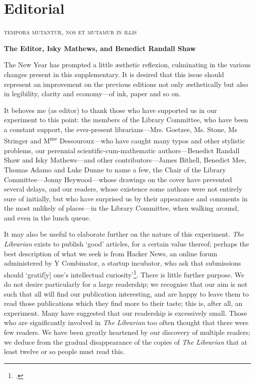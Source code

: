 \chapter{Editorial}

\hspace{\fill}\textsc{tempora mutantur, nos et mutamur in illis}

\hspace{\fill}\textbf{{The Editor, Isky Mathews, and Benedict Randall Shaw}}

\begin{multicols}{2}

The New Year has prompted a little æsthetic reflexion, culminating in the 
various changes present in this supplementary. It is desired that this issue
should represent an improvement on the previous editions not only æsthetically
but also in legibility, clarity and economy---of ink, paper and so on. 

It behoves me (as editor) to thank those who have supported us in our experiment
to this point: the members of the Library Committee, who have been a constant 
support, the ever-present librarians---Mrs. Goetzee, Ms. Stone, Ms Stringer and 
M\textsuperscript{me} Dessouroux---who have caught many typos and other stylistic problems, our 
perennial scientific-cum-mathematic authors---Benedict Randall Shaw and Isky 
Mathews---and other contributors---James Bithell, Benedict Mee, Thomas Adamo 
and Luke Dunne to name a few, the Chair of the Library Committee---Jonny 
Heywood---whose drawings on the cover have prevented several delays, and our 
readers, whose existence some authors were not entirely sure of initially, but 
who have surprised us by their appearance and comments in the most unlikely of 
places---in the Library Committee, when walking around, and even in the lunch 
queue.

It may also be useful to elaborate further on the nature of this experiment. 
\textit{The Librarian} exists to publish `good' articles, for a certain value 
thereof; perhaps the best description of what we seek is from Hacker News, an 
online forum administered by Y Combinator, a startup incubator, who ask that 
submissions should `gratif[y] one's intellectual curiosity'\footcite{hn}. 
There is little further purpose. We do not desire particularly for a large 
readership; we recognise that our aim is not such that all will find our 
publication interesting, and are happy to leave them to read those publications which they find more to their taste; this is, after all, an experiment. Many have suggested that our readership is excessively small. Those who
are significantly involved in \textit{The Librarian} too often thought that
there were few readers. We have been greatly heartened by our discovery of 
multiple readers; we deduce from the gradual disappearance of the copies of 
\textit{The Librarian} that at least twelve or so people must read this.


\end{multicols}
